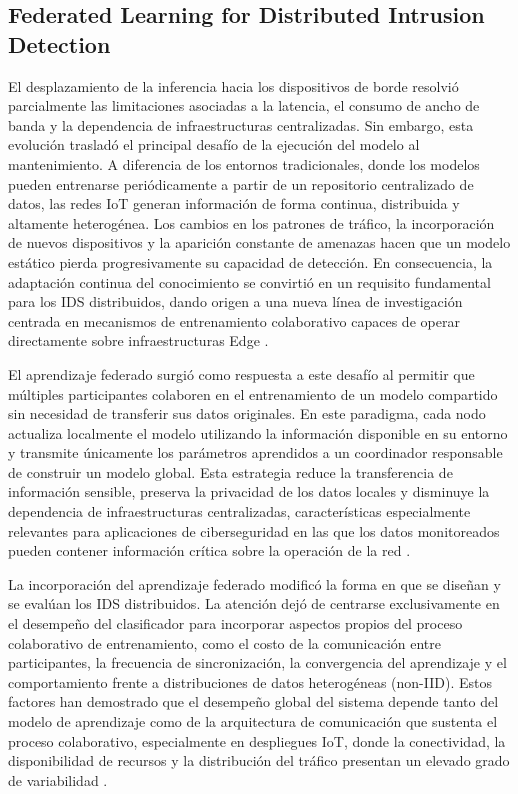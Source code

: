 \documentclass[journal,article,submit,moreauthors]{Definitions/mdpi}
\begin{document}
\subsection{Federated Learning for Distributed Intrusion Detection}
El desplazamiento de la inferencia hacia los dispositivos de borde resolvió parcialmente las limitaciones asociadas a la latencia, el consumo de ancho de banda y la dependencia de infraestructuras centralizadas. Sin embargo, esta evolución trasladó el principal desafío de la ejecución del modelo al mantenimiento. A diferencia de los entornos tradicionales, donde los modelos pueden entrenarse periódicamente a partir de un repositorio centralizado de datos, las redes IoT generan información de forma continua, distribuida y altamente heterogénea. Los cambios en los patrones de tráfico, la incorporación de nuevos dispositivos y la aparición constante de amenazas hacen que un modelo estático pierda progresivamente su capacidad de detección. En consecuencia, la adaptación continua del conocimiento se convirtió en un requisito fundamental para los IDS distribuidos, dando origen a una nueva línea de investigación centrada en mecanismos de entrenamiento colaborativo capaces de operar directamente sobre infraestructuras Edge \cite{McMahan2017,Imteaj2022,Ramadan2025,Ren2024}.

El aprendizaje federado surgió como respuesta a este desafío al permitir que múltiples participantes colaboren en el entrenamiento de un modelo compartido sin necesidad de transferir sus datos originales. En este paradigma, cada nodo actualiza localmente el modelo utilizando la información disponible en su entorno y transmite únicamente los parámetros aprendidos a un coordinador responsable de construir un modelo global. Esta estrategia reduce la transferencia de información sensible, preserva la privacidad de los datos locales y disminuye la dependencia de infraestructuras centralizadas, características especialmente relevantes para aplicaciones de ciberseguridad en las que los datos monitoreados pueden contener información crítica sobre la operación de la red \cite{McMahan2017,Imteaj2022,Hajj2023,Roy2023}.

La incorporación del aprendizaje federado modificó la forma en que se diseñan y se evalúan los IDS distribuidos. La atención dejó de centrarse exclusivamente en el desempeño del clasificador para incorporar aspectos propios del proceso colaborativo de entrenamiento, como el costo de la comunicación entre participantes, la frecuencia de sincronización, la convergencia del aprendizaje y el comportamiento frente a distribuciones de datos heterogéneas (non-IID). Estos factores han demostrado que el desempeño global del sistema depende tanto del modelo de aprendizaje como de la arquitectura de comunicación que sustenta el proceso colaborativo, especialmente en despliegues IoT, donde la conectividad, la disponibilidad de recursos y la distribución del tráfico presentan un elevado grado de variabilidad \cite{Imteaj2022,Hajj2023,Chaurasia2024,Albanbay2025,Ramadan2025,Cooray2025,Ma2024}.
\end{document}
